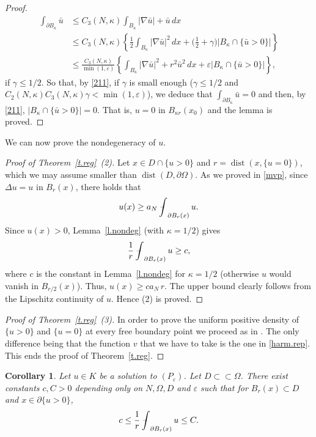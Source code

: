 \documentclass[11pt]{amsart}
\newtheorem{corollary}{Corollary}[section]
\theoremstyle{definition}
\theoremstyle{remark}
\numberwithin{equation}{section}
\DeclareMathOperator{\dist}{dist}
\newcommand{\avint}{\mathop{\,\rlap{--}\!\!\int}\nolimits}
\begin{document}
\begin{proof}
\[
\begin{aligned}
\int_{\partial B_\kappa}\bar u&\le C_3(N,\kappa)\int_{B_\kappa}|\nabla\bar u|+\bar u\,dx\\
&\le C_3(N,\kappa)\left\{\frac12\int_{B_\kappa}|\nabla\bar u|^2\,dx+\Big(\frac12+\gamma\Big)|B_\kappa\cap\{\bar u>0\}|\right\}\\
&\le\frac{C_3(N,\kappa)}{\min(1,\varepsilon)}\left\{\int_{B_\kappa}|\nabla\bar u|^2+r^2\bar u^2\,dx+\varepsilon|B_\kappa\cap\{\bar u>0\}|\right\},
\end{aligned}
\]
if $\gamma\le1/2$. So that, by \eqref{211}, if $\gamma$ is small enough ($\gamma\le1/2$ and $C_2(N,\kappa)C_3(N,\kappa)\gamma<\min(1,\varepsilon)$), we deduce that $\int_{\partial B_\kappa}\bar u=0$ and then, by \eqref{211}, $|B_\kappa\cap\{\bar u>0\}|=0$. That is, $u=0$ in $B_{\kappa r}(x_0)$ and the lemma is proved.
\end{proof}

We can now prove the nondegeneracy of $u$.

\begin{proof}[Proof of Theorem~\ref{t.reg}~(2)]
Let $x\in D\cap\{u>0\}$ and $r=\dist(x,\{u=0\})$, which we may assume smaller than $\dist(D,\partial\Omega)$. As we proved in \eqref{mvp}, since $\Delta u=u$ in $B_r(x)$, there holds that
\[
u(x)\ge a_N\avint_{\partial B_r(x)}u.
\]
Since $u(x)>0$, Lemma~\ref{l.nondeg} (with $\kappa=1/2$) gives
\[
\frac1r\avint_{\partial B_r(x)}u\ge c,
\]
where $c$ is the constant in Lemma~\ref{l.nondeg} for $\kappa=1/2$ (otherwise $u$ would vanish in $B_{r/2}(x)$). Thus, $u(x)\ge ca_N\,r$. The upper bound clearly follows from the Lipschitz continuity of $u$. Hence (2) is proved.
\end{proof}

\begin{proof}[Proof of Theorem~\ref{t.reg}~(3)]
In order to prove the uniform positive density of $\{u>0\}$ and $\{u=0\}$ at every free boundary point we proceed as in \cite[Lemma~3.7]{AC}. The only difference being that the function $v$ that we have to take is the one in \eqref{harm.rep}. This ends the proof of Theorem~\ref{t.reg}.
\end{proof}

\begin{corollary}\label{c.dens}
Let $u\in K$ be a solution to $(P_\varepsilon)$. Let $D\subset\subset\Omega$. There exist constants $c,C>0$ depending only on $N,\Omega,D$ and $\varepsilon$ such that for $B_r(x)\subset D$ and $x\in\partial\{u>0\}$,
\begin{equation}\label{212}
c\le\frac1r\avint_{\partial B_r(x)}u\le C.
\end{equation}
\end{corollary}
\end{document}
